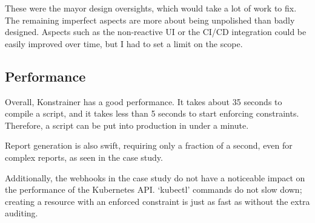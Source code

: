 These were the mayor design oversights, which would take a lot of work to fix. The remaining imperfect aspects are more about being unpolished than badly designed. Aspects such as the non-reactive UI or the CI/CD integration could be easily improved over time, but I had to set a limit on the scope.

\subsection{Performance}

Overall, Konstrainer has a good performance. It takes about 35 seconds to compile a script, and it takes less than 5 seconds to start enforcing constraints. Therefore, a script can be put into production in under a minute.

Report generation is also swift, requiring only a fraction of a second, even for complex reports, as seen in the case study.

Additionally, the webhooks in the case study do not have a noticeable impact on the performance of the Kubernetes API. `kubectl' commands do not slow down; creating a resource with an enforced constraint is just as fast as without the extra auditing.
